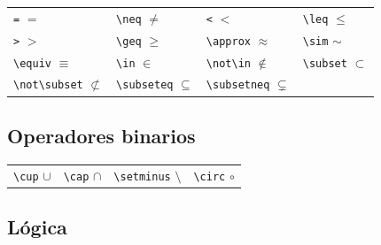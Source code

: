 \documentclass[
  spanish,
  a4paper,
]{scrreport}
\newcounter{none} %
\theoremstyle{definition}
\theoremstyle{remark}
\begin{document}
{\def\LTcaptype{none} %
\begin{longtable}[]{@{}
  >{\raggedright\arraybackslash}p{}
  >{\raggedright\arraybackslash}p{}
  >{\raggedright\arraybackslash}p{}
  >{\raggedright\arraybackslash}p{}@{}}
\toprule\noalign{}
\endhead
\bottomrule\noalign{}
\endlastfoot
\texttt{=} \(=\) & \texttt{\textbackslash{}neq} \(\neq\) &
\texttt{\textless{}} \(<\) & \texttt{\textbackslash{}leq} \(\leq\) \\
\texttt{\textgreater{}} \(>\) & \texttt{\textbackslash{}geq} \(\geq\) &
\texttt{\textbackslash{}approx} \(\approx\) &
\texttt{\textbackslash{}sim} \(\sim\) \\
\texttt{\textbackslash{}equiv} \(\equiv\) & \texttt{\textbackslash{}in}
\(\in\) & \texttt{\textbackslash{}not\textbackslash{}in} \(\not\in\) &
\texttt{\textbackslash{}subset} \(\subset\) \\
\texttt{\textbackslash{}not\textbackslash{}subset} \(\not\subset\) &
\texttt{\textbackslash{}subseteq} \(\subseteq\) &
\texttt{\textbackslash{}subsetneq} \(\subsetneq\) & \\
\end{longtable}
}

\subsection{Operadores binarios}\label{operadores-binarios}

{\def\LTcaptype{none} %
\begin{longtable}[]{@{}
  >{\raggedright\arraybackslash}p{}
  >{\raggedright\arraybackslash}p{}
  >{\raggedright\arraybackslash}p{}
  >{\raggedright\arraybackslash}p{}@{}}
\toprule\noalign{}
\endhead
\bottomrule\noalign{}
\endlastfoot
\texttt{\textbackslash{}cup} \(\cup\) & \texttt{\textbackslash{}cap}
\(\cap\) & \texttt{\textbackslash{}setminus} \(\setminus\) &
\texttt{\textbackslash{}circ} \(\circ\) \\
\end{longtable}
}

\subsection{Lógica}\label{luxf3gica}
\end{document}
